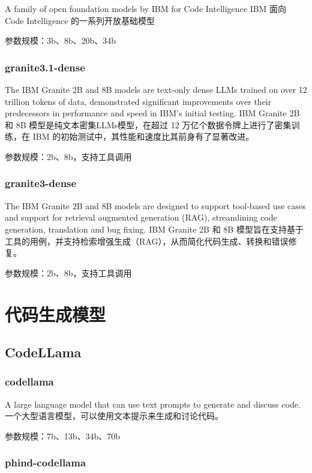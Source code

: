 \documentclass[12pt,UTF8]{ctexbook}
\begin{document}
A family of open foundation models by IBM for Code Intelligence
IBM 面向 Code Intelligence 的一系列开放基础模型

参数规模：3b、8b、20b、34b

\subsection{granite3.1-dense}

The IBM Granite 2B and 8B models are text-only dense LLMs trained on over 12 trillion tokens of data, demonstrated significant improvements over their predecessors in performance and speed in IBM's initial testing.
IBM Granite 2B 和 8B 模型是纯文本密集LLMs模型，在超过 12 万亿个数据令牌上进行了密集训练，在 IBM 的初始测试中，其性能和速度比其前身有了显著改进。

参数规模：2b、8b，支持工具调用

\subsection{granite3-dense}

The IBM Granite 2B and 8B models are designed to support tool-based use cases and support for retrieval augmented generation (RAG), streamlining code generation, translation and bug fixing.
IBM Granite 2B 和 8B 模型旨在支持基于工具的用例，并支持检索增强生成（RAG），从而简化代码生成、转换和错误修复。

参数规模：2b、8b，支持工具调用

\chapter{代码生成模型}

\section{CodeLLama}

\subsection{codellama}

A large language model that can use text prompts to generate and discuss code.
一个大型语言模型，可以使用文本提示来生成和讨论代码。

参数规模：7b、13b、34b、70b

\subsection{phind-codellama}
\end{document}
